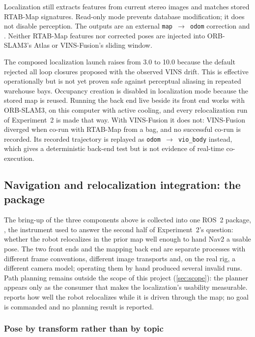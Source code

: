 Localization still extracts features from current stereo images and matches
stored RTAB-Map signatures. Read-only mode prevents database modification; it
does not disable perception. The outputs are an external
\texttt{map~$\rightarrow$~odom} correction and . Neither
RTAB-Map features nor corrected poses are injected into ORB-SLAM3's Atlas or
VINS-Fusion's sliding window.

The composed localization launch raises  from 3.0 to
10.0 because the default rejected all loop closures proposed with the observed
VINS drift. This is effective operationally but is not yet proven safe against
perceptual aliasing in repeated warehouse bays. Occupancy creation is disabled in
localization mode because the stored map is reused. Running the back end live
beside its front end works with ORB-SLAM3, on this computer with active cooling,
and every relocalization run of Experiment~2 is made that way. With VINS-Fusion
it does not: VINS-Fusion diverged when co-run with RTAB-Map from a bag, and no
successful co-run is recorded. Its recorded trajectory is replayed as
\texttt{odom~$\rightarrow$~vio\_body} instead, which gives a deterministic
back-end test but is not evidence of real-time co-execution.

\subsection{Navigation and relocalization integration: the
 package}
\label{sec:nav-integration}

The bring-up of the three components above is collected into one ROS~2 package,
, the instrument used to answer the second half of
Experiment~2's question: whether the robot relocalizes in the prior map well
enough to hand Nav2 a usable pose. The two front ends and the mapping back end are separate processes with
different frame conventions, different image transports and, on the real rig, a
different camera model; operating them by hand produced several invalid runs.
Path planning remains outside the scope of this project (\cref{sec:scope}): the
planner appears only as the consumer that makes the localization's usability
measurable.  reports how well the robot relocalizes while
it is driven through the map; no goal is commanded and no planning result is
reported.

\subsubsection{Pose by transform rather than by topic}

